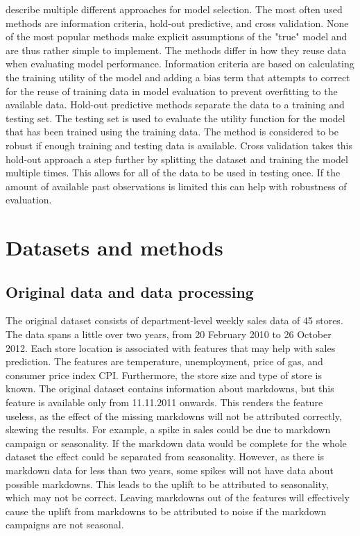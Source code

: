 \documentclass[english, 12pt, a4paper, sci, utf8, a-1b, online]{aaltothesis}
\begin{document}
\cite{vehtari2012} describe multiple different approaches for model selection. The most often used methods are information criteria, hold-out predictive, and cross validation. None of the most popular methods make explicit assumptions of the "true" model and are thus rather simple to implement. The methods differ in how they reuse data when evaluating model performance. Information criteria are based on calculating the training utility of the model and adding a bias term that attempts to correct for the reuse of training data in model evaluation to prevent overfitting to the available data. Hold-out predictive methods separate the data to a training and testing set. The testing set is used to evaluate the utility function for the model that has been trained using the training data. The method is considered to be robust if enough training and testing data is available. Cross validation takes this hold-out approach a step further by splitting the dataset and training the model multiple times. This allows for all of the data to be used in testing once. If the amount of available past observations is limited this can help with robustness of evaluation.


\section{Datasets and methods}


\subsection{Original data and data processing}

The original dataset consists of department-level weekly sales data of 45 stores. The data spans a little over two years, from 20 February 2010 to 26 October 2012. Each store location is associated with features that may help with sales prediction. The features are temperature, unemployment, price of gas, and consumer price index CPI. Furthermore, the store size and type of store is known. The original dataset contains information about markdowns, but this feature is available only from 11.11.2011 onwards. This renders the feature useless, as the effect of the missing markdowns will not be attributed correctly, skewing the results. For example, a spike in sales could be due to markdown campaign or seasonality. If the markdown data would be complete for the whole dataset the effect could be separated from seasonality. However, as there is markdown data for less than two years, some spikes will not have data about possible markdowns. This leads to the uplift to be attributed to seasonality, which may not be correct. Leaving markdowns out of the features will effectively cause the uplift from markdowns to be attributed to noise if the markdown campaigns are not seasonal.
\end{document}
